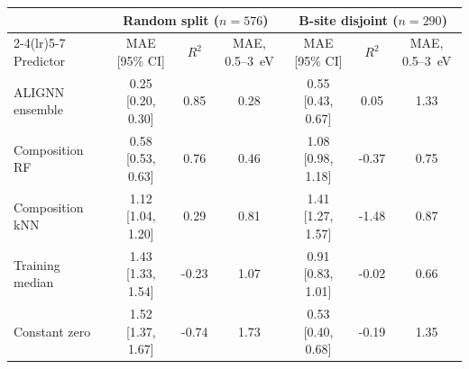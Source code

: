 \begin{tabular}{@{}lcccccc@{}}\toprule
 & \multicolumn{3}{c}{Random split ($n=576$)} & \multicolumn{3}{c}{B-site disjoint ($n=290$)}\\\cmidrule(lr){2-4}\cmidrule(lr){5-7}
Predictor & MAE [95\% CI] & $R^2$ & MAE, 0.5--3~eV & MAE [95\% CI] & $R^2$ & MAE, 0.5--3~eV\\\midrule
ALIGNN ensemble & 0.25 [0.20, 0.30] & 0.85 & 0.28 & 0.55 [0.43, 0.67] & 0.05 & 1.33 \\
Composition RF & 0.58 [0.53, 0.63] & 0.76 & 0.46 & 1.08 [0.98, 1.18] & -0.37 & 0.75 \\
Composition kNN & 1.12 [1.04, 1.20] & 0.29 & 0.81 & 1.41 [1.27, 1.57] & -1.48 & 0.87 \\
Training median & 1.43 [1.33, 1.54] & -0.23 & 1.07 & 0.91 [0.83, 1.01] & -0.02 & 0.66 \\
Constant zero & 1.52 [1.37, 1.67] & -0.74 & 1.73 & 0.53 [0.40, 0.68] & -0.19 & 1.35 \\
\bottomrule\end{tabular}
